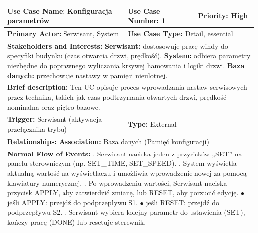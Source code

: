 \documentclass[12pt,a4paper]{article}
\begin{document}
\begin{table}[h!]
\centering
\begin{tabular}{|p{}|p{}|p{}|}
\hline
\textbf{Use Case Name:} Konfiguracja parametrów & \textbf{Use Case Number:} 1 & \textbf{Priority:} High \\ \hline
\textbf{Primary Actor:} Serwisant, System & \multicolumn{2}{l|}{\textbf{Use Case Type:} Detail, essential} \\ \hline
\multicolumn{3}{|p{0.9\textwidth}|}{\textbf{Stakeholders and Interests:} \newline
\textbf{Serwisant:} dostosowuje pracę windy do specyfiki budynku (czas otwarcia drzwi, prędkość). \newline
\textbf{System:} odbiera parametry niezbędne do poprawnego wyliczania krzywej hamowania i logiki drzwi. \newline
\textbf{Baza danych:} przechowuje nastawy w pamięci nieulotnej.} \\ \hline
\multicolumn{3}{|p{0.9\textwidth}|}{\textbf{Brief description:} Ten UC opisuje proces wprowadzania nastaw serwisowych przez technika, takich jak czas podtrzymania otwartych drzwi, prędkość nominalna oraz piętro bazowe.} \\ \hline
\textbf{Trigger:} Serwisant (aktywacja przełącznika trybu) & \multicolumn{2}{l|}{\textbf{Type:} External} \\ \hline
\multicolumn{3}{|p{0.9\textwidth}|}{\textbf{Relationships:} \newline
\textbf{Association:} Baza danych (Pamięć konfiguracji) } \\ \hline
\multicolumn{3}{|p{0.9\textwidth}|}{\textbf{Normal Flow of Events:} \newline
1. Serwisant naciska jeden z przycisków „SET” na panelu sterowniczym (np. SET\_TIME, SET\_SPEED).  \newline
2. System wyświetla aktualną wartość na wyświetlaczu i umożliwia wprowadzenie nowej za pomocą klawiatury numerycznej. \newline
3. Po wprowadzeniu wartości, Serwisant naciska przycisk APPLY, aby zatwierdzić zmianę, lub RESET, aby porzucić edycję. \newline
\hspace*{10pt} $\bullet$ jeśli APPLY: przejdź do podprzepływu S1. \newline
\hspace*{10pt} $\bullet$ jeśli RESET: przejdź do podprzepływu S2. \newline
4. Serwisant wybiera kolejny parametr do ustawienia (SET), kończy pracę (DONE) lub resetuje sterownik. \newline
}
\end{tabular}
\end{table}
\end{document}
